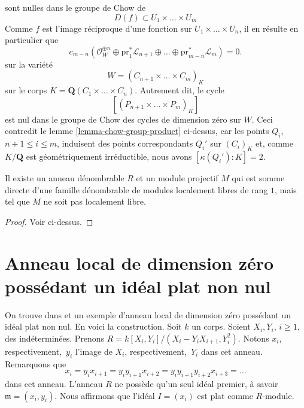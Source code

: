 sont nulles dans le groupe de Chow de
$$
D(f) \subset U_1 \times \ldots \times U_m
$$
Comme $f$ est l'image réciproque d'une fonction sur $U_1 \times \ldots \times U_n$,
il en résulte en particulier que
$$
c_{m - n}(\mathcal{O}_W^{\oplus n} \oplus
\text{pr}_1^*\mathcal{L}_{n + 1} \oplus \ldots
\oplus \text{pr}_{m - n}^*\mathcal{L}_m) = 0.
$$
sur la variété
$$
W = (C_{n + 1} \times \ldots \times C_m)_K
$$
sur le corps $K = \mathbf{Q}(C_1 \times \ldots \times C_n)$.
Autrement dit, le cycle
$$
[(P_{n + 1} \times \ldots \times P_m)_K]
$$
est nul dans le groupe de Chow des cycles de dimension zéro sur $W$. Ceci contredit le
lemme \ref{lemma-chow-group-product}
ci-dessus, car les points $Q_i$, $n + 1 \leq i \leq m$,
induisent des points correspondants $Q_i'$ sur $(C_i)_K$ et, comme $K/\mathbf{Q}$
est géométriquement irréductible, nous avons $[\kappa(Q_i') : K] = 2$.

\begin{lemma}
\label{lemma-projective-not-locally-free}
Il existe un anneau dénombrable $R$ et un module projectif $M$
qui est somme directe d'une famille dénombrable de modules localement libres de rang $1$,
mais tel que $M$ ne soit pas localement libre.
\end{lemma}

\begin{proof}
Voir ci-dessus.
\end{proof}







\section{Anneau local de dimension zéro possédant un idéal plat non nul}
\label{section-zero-dimensional-flat-ideal}

\noindent
On trouve dans \cite{Lazard} et \cite{Autour}
un exemple d'anneau local de dimension zéro possédant un
idéal plat non nul. En voici la construction. Soit $k$ un corps.
Soient $X_i, Y_i$, $i \geq 1$, des indéterminées. Prenons
$R = k[X_i, Y_i]/(X_i - Y_i X_{i + 1}, Y_i^2)$. Notons $x_i$, respectivement,\ $y_i$
l'image de $X_i$, respectivement,\ $Y_i$ dans cet anneau. Remarquons que
$$
x_i = y_i x_{i + 1} = y_i y_{i +1} x_{i + 2} =
y_i y_{i + 1} y_{i + 2} x_{i + 3} = \ldots
$$
dans cet anneau. L'anneau $R$ ne possède qu'un
seul idéal premier, à savoir $\mathfrak m = (x_i, y_i)$. Nous affirmons que
l'idéal $I = (x_i)$ est plat comme $R$-module.

